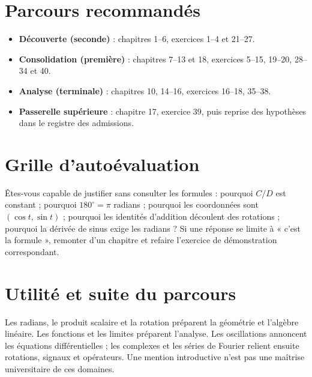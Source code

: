 \documentclass[11pt,a4paper,oneside]{book}
\begin{document}
\section{Parcours recommandés}
\begin{itemize}
\item \textbf{Découverte (seconde)} : chapitres 1--6, exercices 1--4 et 21--27.
\item \textbf{Consolidation (première)} : chapitres 7--13 et 18, exercices 5--15, 19--20, 28--34 et 40.
\item \textbf{Analyse (terminale)} : chapitres 10, 14--16, exercices 16--18, 35--38.
\item \textbf{Passerelle supérieure} : chapitre 17, exercice 39, puis reprise des hypothèses dans le registre des admissions.
\end{itemize}
\section{Grille d'autoévaluation}
Êtes-vous capable de justifier sans consulter les formules : pourquoi $C/D$ est constant ; pourquoi $180^\circ=\pi$ radians ; pourquoi les coordonnées sont $(\cos t,\sin t)$ ; pourquoi les identités d'addition découlent des rotations ; pourquoi la dérivée de sinus exige les radians ? Si une réponse se limite à « c'est la formule », remonter d'un chapitre et refaire l'exercice de démonstration correspondant.
\section{Utilité et suite du parcours}
Les radians, le produit scalaire et la rotation préparent la géométrie et l'algèbre linéaire. Les fonctions et les limites préparent l'analyse. Les oscillations annoncent les équations différentielles ; les complexes et les séries de Fourier relient ensuite rotations, signaux et opérateurs. Une mention introductive n'est pas une maîtrise universitaire de ces domaines.
\end{document}
